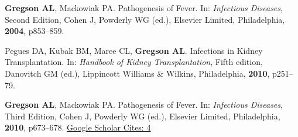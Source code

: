 \documentclass[letterpaper,10pt,sans,dvipsnames,final]{moderncv}%
\begin{document}
\closesection{}
\vspace{0.2cm}
\renewcommand{\refname}{Publications--Chapters}
\begin{thebibliography}{1}
 \bibitem[1]{} \textbf{Gregson AL}, Mackowiak PA. Pathogenesis of Fever. In: {\color{BrickRed}\textit{Infectious Diseases}}, Second Edition, Cohen J, Powderly WG (ed.), Elsevier Limited, Philadelphia, \textbf{2004}, p853--859.

 \bibitem[2]{} Pegues DA, Kubak BM, Maree CL, \textbf{Gregson AL}. Infections in Kidney Transplantation. In: {\color{BrickRed}\textit{Handbook of Kidney Transplantation}}, Fifth edition, Danovitch GM (ed.), Lippincott Williams \& Wilkins, Philadelphia, \textbf{2010}, p251--79. 

 \bibitem[3]{} \textbf{Gregson AL}, Mackowiak PA. Pathogenesis of Fever. In: {\color{BrickRed}\textit{Infectious Diseases}}, Third Edition, Cohen J, Powderly WG (ed.), Elsevier Limited, Philadelphia, \textbf{2010}, p673--678.
   {\color{NavyBlue} \href{https://scholar.google.com/scholar?oi=bibs&hl=en&cites=12937268309899859817}{{\smaller Google Scholar Cites: 4}}
     }

\end{thebibliography} 

\end{document}
